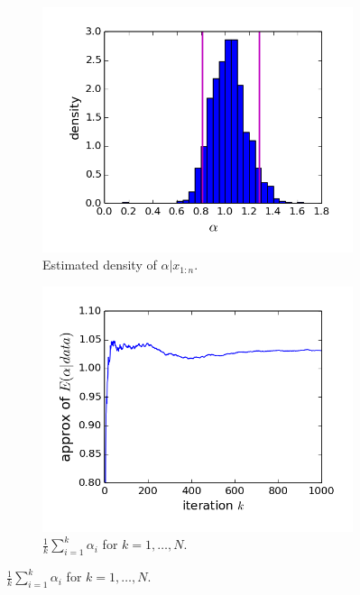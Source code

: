 \documentclass[12pt]{article}
\begin{document}
\begin{figure}
    \begin{subfigure}[t]{0.49\textwidth}
        \centering
        \includegraphics[trim=0 0.6cm 0 0, clip, width=1\textwidth]{Pareto-a_density.png}
        \caption{Estimated density of $\alpha|x_{1:n}$.}
    \end{subfigure}
    \begin{subfigure}[t]{0.49\textwidth}
        \centering
        \includegraphics[trim=0 0.6cm 0 0, clip, width=1\textwidth]{Pareto-a_means.png}
        \caption{$\frac{1}{k}\sum_{i = 1}^k \alpha_i$ for $k=1,\ldots,N$.}

\end{subfigure}
\end{figure}
\end{document}
